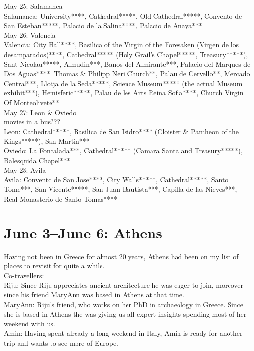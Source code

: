 May 25: Salamanca\\
Salamanca: University****, Cathedral*****, Old Cathedral*****, Convento de San Esteban*****, Palacio de la Salina****, Palacio de Anaya***\\

May 26: Valencia\\
Valencia: City Hall****, Basilica of the Virgin of the Foresaken (Virgen de los desamparados)****, Cathedral***** (Holy Grail's Chapel*****, Treasury*****), Sant Nicolau*****, Almudin***, Banos del Almirante***, Palacio del Marques de Dos Aguas****, Thomas \& Philipp Neri Church**, Palau de Cervello**, Mercado Central***, Llotja de la Seda*****, Science Museum***** (the actual Museum exhibit***), Hemisferic*****, Palau de les Arts Reina Sofia****, Church Virgin Of Monteolivete**\\

May 27: Leon \& Oviedo\\
movies in a bus???\\

Leon: Cathedral*****, Basilica de San Isidro**** (Cloister \& Pantheon of the Kings*****), San Martin***\\
Oviedo: La Foncalada***, Cathedral***** (Camara Santa and Treasury*****), Balesquida Chapel***\\

May 28: Avila\\
Avila: Convento de San Jose****, City Walls*****, Cathedral*****, Santo Tome***, San Vicente*****, San Juan Bautista***, Capilla de las Nieves***, Real Monasterio de Santo Tomas****

\section{June 3--June 6: Athens}
\label{2017Athens}

Having not been in Greece for almost 20 years, Athens had been on my list of places to revisit for quite a while. \\

Co-travellers:\\
Riju: Since Riju appreciates ancient architecture he was eager to join, moreover since his friend MaryAnn was based in Athens at that time.\\
MaryAnn: Riju's friend, who works on her PhD in archaeology in Greece. Since she is based in Athens the was giving us all expert insights spending most of her weekend with us.\\
Amin: Having spent already a long weekend in Italy, Amin is ready for another trip and wants to see more of Europe.\\


